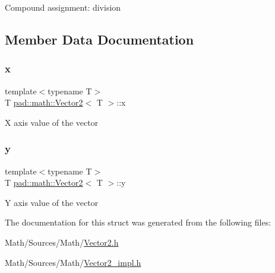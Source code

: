 Compound assignment\+: division 

\subsection{Member Data Documentation}
\mbox{\label{structpad_1_1math_1_1_vector2_a3d4fc9deec4a8fd923ea4f5f73dfb763}} 
\subsubsection{\texorpdfstring{x}{x}}
{\footnotesize\ttfamily template$<$typename T$>$ \\
T \mbox{\hyperlink{structpad_1_1math_1_1_vector2}{pad\+::math\+::\+Vector2}}$<$ T $>$\+::x}

X axis value of the vector \mbox{\label{structpad_1_1math_1_1_vector2_a481eca28456d2e02f635059d379b89f5}} 
\subsubsection{\texorpdfstring{y}{y}}
{\footnotesize\ttfamily template$<$typename T$>$ \\
T \mbox{\hyperlink{structpad_1_1math_1_1_vector2}{pad\+::math\+::\+Vector2}}$<$ T $>$\+::y}

Y axis value of the vector 

The documentation for this struct was generated from the following files\+:\begin{DoxyCompactItemize}
\item 
Math/\+Sources/\+Math/\mbox{\hyperlink{_vector2_8h}{Vector2.\+h}}\item 
Math/\+Sources/\+Math/\mbox{\hyperlink{_vector2__impl_8h}{Vector2\+\_\+impl.\+h}}\end{DoxyCompactItemize}
